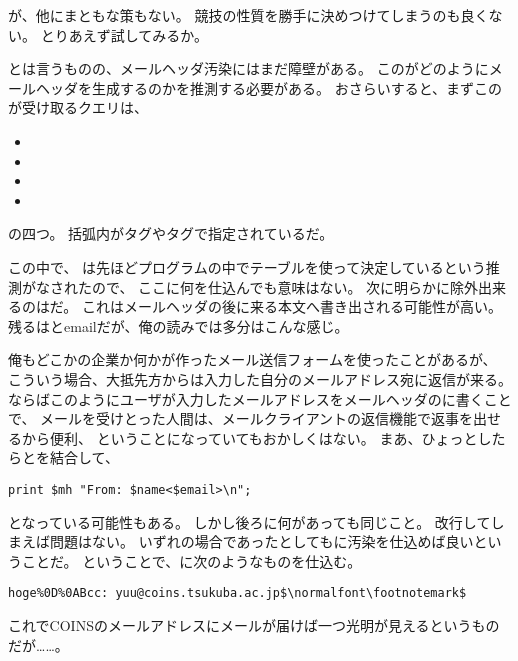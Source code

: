 が、他にまともな策もない。
競技の性質を勝手に決めつけてしまうのも良くない。
とりあえず試してみるか。

とは言うものの、メールヘッダ汚染にはまだ障壁がある。
このがどのようにメールヘッダを生成するのかを推測する必要がある。
おさらいすると、まずこのが受け取るクエリは、

\begin{itemize}
	\item {}
	\item {}
	\item {}
	\item {}
\end{itemize}

の四つ。
括弧内がタグやタグで指定されているだ。

この中で、
は先ほどプログラムの中でテーブルを使って決定しているという推測がなされたので、
ここに何を仕込んでも意味はない。
次に明らかに除外出来るのはだ。
これはメールヘッダの後に来る本文へ書き出される可能性が高い。
残るはと{email}だが、俺の読みでは多分はこんな感じ。



俺もどこかの企業か何かが作ったメール送信フォームを使ったことがあるが、
こういう場合、大抵先方からは入力した自分のメールアドレス宛に返信が来る。
ならばこのようにユーザが入力したメールアドレスをメールヘッダのに書くことで、
メールを受けとった人間は、メールクライアントの返信機能で返事を出せるから便利、
ということになっていてもおかしくはない。
まあ、ひょっとしたらとを結合して、

\begin{lstlisting}[style=perl, firstnumber=11]
print $mh "From: $name<$email>\n";
\end{lstlisting}

となっている可能性もある。
しかし後ろに何があっても同じこと。
改行してしまえば問題はない。
いずれの場合であったとしてもに汚染を仕込めば良いということだ。
ということで、に次のようなものを仕込む。

\begin{lstlisting}[mathescape]
hoge%0D%0ABcc: yuu@coins.tsukuba.ac.jp$\normalfont\footnotemark$
\end{lstlisting}

これでCOINSのメールアドレスにメールが届けば一つ光明が見えるというものだが……。




